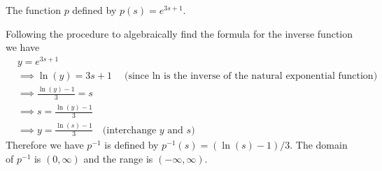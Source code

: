 \documentclass[nooutcomes]{ximera}
\renewenvironment{freeResponse}{
\ifhandout\setbox0\vbox\bgroup\else
\begin{trivlist}\item[\hskip \labelsep\bfseries Solution:\hspace{2ex}]
\fi}
{\ifhandout\egroup\else
\end{trivlist}
\fi}
\begin{document}
\begin{problem}
\begin{itemize}
    \item[(d)]
      The function $p$ defined by $p(s) = e^{3s+1}$.
      \begin{freeResponse}
        Following the procedure to algebraically find  the formula for the inverse function we have
        \begin{align*}
          &\mbox{} y = e^{3s+1}\\
          &\implies \ln(y) = 3s + 1 \hspace{1em} \mbox{(since $\ln$ is the inverse of the natural exponential function)}\\
          &\implies \frac{\ln(y) - 1}{3} = s\\
          &\implies s = \frac{\ln(y) - 1}{3}\\
          &\implies y = \frac{\ln(s) - 1}{3} \hspace{1em} \mbox{(interchange $y$ and $s$)}
        \end{align*}
        Therefore we have $p^{-1}$ is defined by $p^{-1}(s) = (\ln(s) - 1)/3$.
        The domain of $p^{-1}$ is $(0, \infty)$ and the range is $(-\infty, \infty)$.
      \end{freeResponse}
  \end{itemize}
\end{problem}
\end{document}
